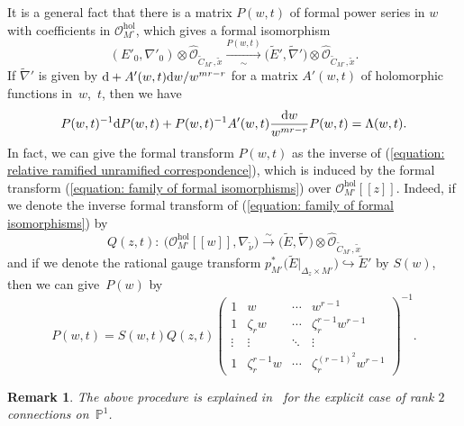 \documentclass[pdftex]{sigma}
\numberwithin{equation}{section}
\newtheorem{Remark}[Theorem]{Remark}
\begin{document}
It is a general fact \cite[Proposition 2.2]{Jimbo-Miwa-Ueno} that
there is a matrix
$P(w,t)$ of formal power series in $w$ with coefficients
in ${\mathcal O}_{M^{\circ}}^{\mathrm{hol}}$,
which gives a formal isomorphism
\begin{equation} \label{equation: formal transform in w}
 (E'_0,\nabla'_0)\otimes\widehat{\mathcal O}_{\tilde{C}_{M^{\circ}},\tilde{x}}
 \xrightarrow[\sim]{P(w,t)}
 \big(\tilde{E}',\tilde{\nabla}'\big)\otimes\widehat{\mathcal O}_{\tilde{C}_{M^{\circ}},\tilde{x}}.
\end{equation}
If $\tilde{\nabla}'$ is given by
${\rm d}+A'(w,t){\rm d}w/w^{mr-r}$ for a matrix $A'(w,t)$ of holomorphic functions in~$w$,~$t$,
then we have
\[
 P(w,t)^{-1} {\rm d}P(w,t)
 +P(w,t)^{-1} A'(w,t)\frac{{\rm d}w}{w^{mr-r}} P(w,t)
 =
 \Lambda(w,t).
\]
In fact, we can give the formal transform $P(w,t)$
as the inverse of (\ref{equation: relative ramified unramified correspondence}),
which is induced by the formal transform
(\ref{equation: family of formal isomorphisms})
over ${\mathcal O}_{M^{\circ}}^{\mathrm{hol}}[[z]]$.
Indeed, if we denote the inverse formal transform of
(\ref{equation: family of formal isomorphisms})
by
\begin{equation} \label{equation: setting of Q(z)}
 Q(z,t) \colon \
 \big({\mathcal O}_{M^{\circ}}^{\mathrm{hol}}[[w]],\nabla_{\tilde{\nu}}\big)
 \stackrel{\sim}\longrightarrow
 \big(\tilde{E},\tilde{\nabla}\big)\otimes\widehat{\mathcal O}_{\tilde{C}_{M^{\circ}},\tilde{x}}
\end{equation}
and if we denote the rational gauge transform
$p_{M'}^*\big(\tilde{E}|_{\Delta_z\times M'}\big)
\hookrightarrow \tilde{E}'$ by $S(w)$,
then we can give~$P(w)$ by
\begin{equation} \label{equation: formal transform using z parameter}
 P(w,t)
 =
 S(w,t) Q(z,t)
 \begin{pmatrix}
 1 & w & \cdots & w^{r-1} \\
 1 & \zeta_rw & \cdots & \zeta_r^{r-1}w^{r-1} \\
 \vdots & \vdots & \ddots & \vdots \\
 1 & \zeta_r^{r-1}w & \cdots & \zeta_r^{(r-1)^2}w^{r-1}
 \end{pmatrix}^{-1}.
\end{equation}

\begin{Remark}
The above procedure
is explained in~\cite[Proposition~10]{Diarra-Loray} for the explicit case of rank $2$
connections on~$\mathbb{P}^1$.
\end{Remark}
\end{document}
